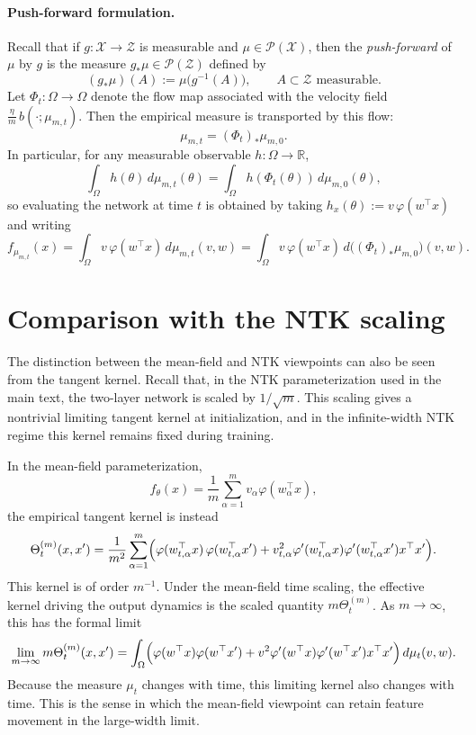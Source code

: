 \paragraph{Push-forward formulation.}
Recall that if $g:\mathcal X\to\mathcal Z$ is measurable and $\mu\in\mathcal P(\mathcal X)$, then the
\emph{push-forward} of $\mu$ by $g$ is the measure $g_*\mu\in\mathcal P(\mathcal Z)$ defined by
\[
	(g_*\mu)(A):=\mu\bigl(g^{-1}(A)\bigr),
	\qquad A\subset\mathcal Z \text{ measurable}.
\]
Let $\Phi_t:\Omega\to\Omega$ denote the flow map associated with the velocity field
$\frac{\eta}{m}\,b(\cdot;\mu_{m,t})$. Then the empirical measure is transported by this flow:
\[
	\mu_{m,t} = (\Phi_t)_*\mu_{m,0}.
\]
In particular, for any measurable observable $h:\Omega\to\mathbb R$,
\[
	\int_\Omega h(\theta)\,d\mu_{m,t}(\theta)
	=
	\int_\Omega h\!\left(\Phi_t(\theta)\right)\,d\mu_{m,0}(\theta),
\]
so evaluating the network at time $t$ is obtained by taking
$h_x(\theta):=v\,\varphi(w^\top x)$ and writing
\[
	f_{\mu_{m,t}}(x)
	=
	\int_\Omega v\,\varphi(w^\top x)\,d\mu_{m,t}(v,w)
	=
	\int_\Omega v\,\varphi(w^\top x)\,d\bigl((\Phi_t)_*\mu_{m,0}\bigr)(v,w).
\]

\section{Comparison with the NTK scaling}\label{app:mf-comparison-ntk}

The distinction between the mean-field and NTK viewpoints can also be seen from
the tangent kernel. Recall that, in the NTK parameterization used in the main
text, the two-layer network is scaled by \(1/\sqrt m\). This scaling gives a
nontrivial limiting tangent kernel at initialization, and in the infinite-width
NTK regime this kernel remains fixed during training.

In the mean-field parameterization,
\[
	f_\theta(x)
	=
	\frac1m
	\sum_{\alpha=1}^m
	v_\alpha\varphi(w_\alpha^\top x),
\]
the empirical tangent kernel is instead
\begin{equation}
	\Theta^{(m)}_t(x,x')
	=
	\frac{1}{m^2}\sum_{\alpha=1}^m
	\Bigl(
	\varphi(w_{t,\alpha}^\top x)\,\varphi(w_{t,\alpha}^\top x')
	+
	v_{t,\alpha}^2
	\varphi'(w_{t,\alpha}^\top x)
	\varphi'(w_{t,\alpha}^\top x')
	x^\top x'
	\Bigr).
	\label{eq:app-mf-ntk-equation}
\end{equation}
This kernel is of order \(m^{-1}\). Under the mean-field time scaling, the
effective kernel driving the output dynamics is the scaled quantity
\(m\Theta^{(m)}_t\). As \(m\to\infty\), this has the formal limit
\[
	\lim_{m\to\infty}m\Theta^{(m)}_t(x,x')
	=
	\int_\Omega
	\Bigl(
	\varphi(w^\top x)\varphi(w^\top x')
	+
	v^2\varphi'(w^\top x)\varphi'(w^\top x')x^\top x'
	\Bigr)
	\,d\mu_t(v,w).
\]
Because the measure \(\mu_t\) changes with time, this limiting kernel also
changes with time. This is the sense in which the mean-field viewpoint can
retain feature movement in the large-width limit.

